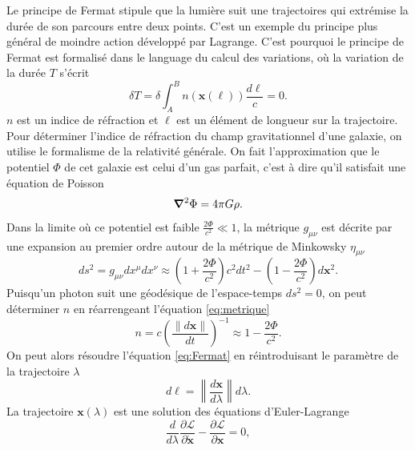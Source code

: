 Le principe de Fermat stipule que la lumière suit une trajectoires qui extrémise
la durée de son parcours entre deux points. 
C'est un exemple du principe 
plus général de moindre action développé par Lagrange. 
C'est pourquoi le principe de Fermat est formalisé dans le language du calcul 
des variations, où la variation de la durée $T$ s'écrit
\begin{equation}\label{eq:Fermat}
        \delta T =  \delta \int_{A}^{B} n(\mathbf{x}(\ell)) \frac{d\ell}{c}= 0 .
\end{equation}
$n$ est un indice de réfraction et $\ell$ est un élément de longueur sur 
la trajectoire.
Pour déterminer l'indice de réfraction du champ gravitationnel d'une galaxie, 
on utilise le formalisme de la relativité générale. On fait l'approximation 
que le potentiel $\Phi$ de cet galaxie est celui d'un gas parfait, c'est à dire 
qu'il satisfait une équation de Poisson
\begin{equation}\label{eq:Poisson}
       \grad^{2}\Phi = 4\pi G \rho .
\end{equation} 
Dans la limite où ce potentiel est faible $\displaystyle \frac{2\Phi}{c^{2}} \ll 1$, la 
métrique $g_{\mu \nu}$ est décrite par une expansion au premier ordre autour de la 
métrique de Minkowsky $\eta_{\mu\nu}$
\begin{equation}\label{eq:metrique}
        ds^2 = g_{\mu\nu}dx^{\mu}dx^{\nu} \approx \left( 1 + \frac{2\Phi}{c^{2}} \right)c^{2}dt^{2} - \left( 1 - \frac{2\Phi}{c^{2}} \right)d\mathbf{x}^{2}.
\end{equation} 
Puisqu'un photon suit une géodésique de l'espace-temps $ds^{2} = 0$, on peut déterminer 
$n$ en réarrengeant l'équation \eqref{eq:metrique}
\begin{equation}\label{eq:n}
        n = c \left( \frac{\lVert d \mathbf{x} \rVert}{dt}  \right)^{-1} \approx  1 - \frac{2\Phi}{c^{2}}.
\end{equation} 
On peut alors résoudre l'équation \eqref{eq:Fermat} 
en réintroduisant le paramètre de la trajectoire $\lambda$
\begin{equation}\label{eq:ell}
        d\ell = \left\lVert\frac{d  \mathbf{x} }{d\lambda} \right\rVert d\lambda .
\end{equation} 
La trajectoire $\mathbf{x}(\lambda)$ est une solution des équations d'Euler-Lagrange
\begin{equation}\label{eq:EulerLagrange}
        \frac{d }{d \lambda} \frac{\partial \mathcal{L}}{\partial \dot{\mathbf{x}}} - \frac{\partial \mathcal{L}}{\partial \mathbf{x}} = 0 ,
\end{equation} 
